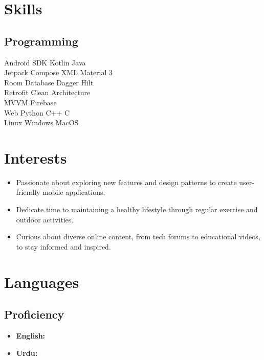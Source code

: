 \documentclass[bold]{deedy-resume-openfont}
\begin{document}
\begin{minipage}[t]{0.33\textwidth}

\section{Skills}
\subsection{Programming}
Android SDK \textbullet{} Kotlin \textbullet{} Java \\
Jetpack Compose \textbullet{} XML \textbullet{} Material 3  \\
Room Database \textbullet{} Dagger Hilt \\ 
Retrofit \textbullet{} Clean Architecture \\ 
MVVM \textbullet{} Firebase  \\
Web \textbullet{} Python \textbullet{} C++ \textbullet{} C \\
Linux \textbullet{} Windows \textbullet{} MacOS
\sectionsep


\section*{Interests}
\begin{itemize}[leftmargin=0pt]
    \item {} Passionate about exploring new features and design patterns to create user-friendly mobile applications.
    \item {} Dedicate time to maintaining a healthy lifestyle through regular exercise and outdoor activities.
    \item {} Curious about diverse online content, from tech forums to educational videos, to stay informed and inspired.
\end{itemize}


\section{Languages}
\subsection{Proficiency}
\begin{itemize}[label=\textbullet, leftmargin=*, topsep=5pt, itemsep=-1ex]
    \item \textbf{English:} 
    \item \textbf{Urdu:} 
\end{itemize}
\sectionsep


%
%

\end{minipage} 
\end{document}
